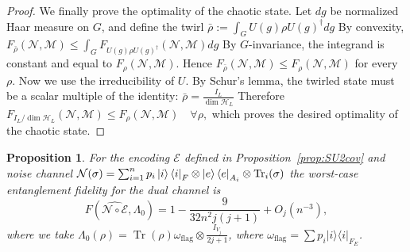 \documentclass[10pt,twocolumn,superscriptaddress,aps,amsmath,amssymb,citeautoscript,floatfix,prx]{revtex4-2}
\theoremstyle{plain}
\theoremstyle{plain}
\theoremstyle{plain}
\theoremstyle{plain}
\theoremstyle{plain}
\theoremstyle{plain}
\theoremstyle{plain}
\newtheorem{smproposition}[smtheorem]{Proposition}
\theoremstyle{definition}
\theoremstyle{plain}
\begin{document}
\begin{appendix}
\begin{proof}
    We finally prove the optimality of the chaotic state. Let $dg$ be normalized Haar measure on $G$, and define the twirl
$
\bar{\rho}:=\int_G U(g) \rho U(g)^{\dagger} dg
$
By convexity,
$
F_{\bar{\rho}}(\mathcal{N}, \mathcal{M}) \leq \int_G F_{U(g) \rho U(g)^{\dagger}}(\mathcal{N}, \mathcal{M}) d g
$
By $G$-invariance, the integrand is constant and equal to $F_\rho(\mathcal{N}, \mathcal{M})$. Hence
$
F_{\bar{\rho}}(\mathcal{N}, \mathcal{M}) \leq F_\rho(\mathcal{N}, \mathcal{M})
$
for every $\rho$.
Now we use the irreducibility of $U$. By Schur's lemma, the twirled state must be a scalar multiple of the identity:
$
    \bar{\rho}=\frac{I_{L}}{\operatorname{dim} \mathcal{H}_{L}}
$
Therefore
$
F_{I_{L} / \operatorname{dim} \mathcal{H}_{L}}(\mathcal{N}, \mathcal{M}) \leq F_\rho(\mathcal{N}, \mathcal{M}) \quad \forall \rho,
$
which proves the desired optimality of the chaotic state.
\end{proof}

\begin{smproposition}\label{prop:SU2covFidelity}
    For the encoding $\mathcal{E}$ defined in Proposition~\ref{prop:SU2cov} and noise channel $\mathcal{N}(\sigma)=\sum_{i=1}^n p_i\ket{i}\bra{i}_F \otimes \ket{e}\bra{e}_{A_i} \otimes \operatorname{Tr}_i(\sigma)$ 
    the worst-case entanglement fidelity for the dual channel is
    \[
        F(\widehat{\mathcal{N} \circ \mathcal{E}}, \Lambda_0)=1-\frac{9}{32 n^2 j(j+1)}+O_{j}\left(n^{-3}\right),
    \]
    where we take $\Lambda_0(\rho)=\operatorname{Tr}(\rho) \omega_{\text{flag}}\otimes\frac{I_{V_{j}}}{2 j+1}$, where $\omega_{\text{flag}}=\sum p_i|i\rangle\langle i|_{F_E}$.
\end{smproposition}


\end{appendix}
\end{document}
